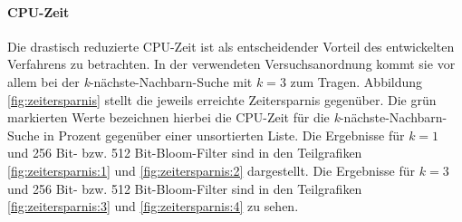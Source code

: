 \paragraph*{CPU-Zeit}
Die drastisch reduzierte CPU-Zeit ist als entscheidender Vorteil des entwickelten Verfahrens zu betrachten. In der verwendeten Versuchsanordnung kommt sie vor allem bei der \textit{k}-nächste-Nachbarn-Suche mit $k=3$ zum Tragen. Abbildung \ref{fig:zeitersparnis} stellt die jeweils erreichte Zeitersparnis gegenüber. Die grün markierten Werte bezeichnen hierbei die CPU-Zeit für die \textit{k}-nächste-Nachbarn-Suche in Prozent gegenüber einer unsortierten Liste.  Die Ergebnisse für $k=1$ und 256 Bit- bzw. 512 Bit-Bloom-Filter sind in den Teilgrafiken \ref{fig:zeitersparnis:1} und \ref{fig:zeitersparnis:2} dargestellt. Die Ergebnisse für $k=3$ und 256 Bit- bzw. 512 Bit-Bloom-Filter sind in den Teilgrafiken \ref{fig:zeitersparnis:3} und \ref{fig:zeitersparnis:4} zu sehen. 
